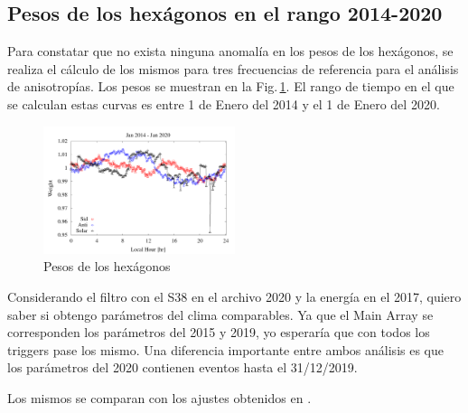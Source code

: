\subsection{Pesos de los hexágonos en el rango 2014-2020}

Para constatar que no exista ninguna anomalía en los pesos de los hexágonos, se realiza el cálculo de los mismos para tres frecuencias de referencia para el análisis de anisotropías.  Los pesos se muestran en la Fig.\,\ref{fig:wei_14_20}. El rango de tiempo en el que se calculan estas curvas es entre 1 de Enero del 2014 y el 1 de Enero del 2020.

\begin{figure}[H]
	\centering
	\includegraphics[width=0.5\textwidth]{weigth2014-2020_jan.png} 	
	\caption{Pesos de los hexágonos}
	\label{fig:wei_14_20}
\end{figure}



      Considerando el filtro con el S38 en el archivo 2020 y la energía en el 2017, quiero saber si obtengo parámetros  del clima comparables. Ya que el Main Array se corresponden los parámetros del 2015 y 2019, yo esperaría que con todos los triggers pase los mismo. Una diferencia importante entre ambos análisis es que los parámetros del 2020 contienen eventos hasta el 31/12/2019.
      
      Los mismos se comparan con los ajustes obtenidos en \cite{aab2017impact}.

